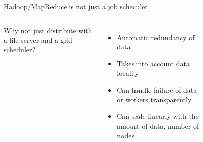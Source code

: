 \documentclass{beamer}
\begin{document}
\begin{frame}{Hadoop/MapReduce is not just a job scheduler}  
  \begin{columns}
    Why not just distribute with a file server and a grid scheduler?
      \begin{itemize}
        \item<2-> Automatic redundancy of data
        \item<3-> Takes into account data locality
        \item<4-> Can handle failure of data or workers transparently
        \item<5-> Can scale linearly with the amount of data, number of nodes
      \end{itemize}
\begin{figure}
  \centering
\end{figure}
 \end{columns}
\end{frame}
\end{document}
